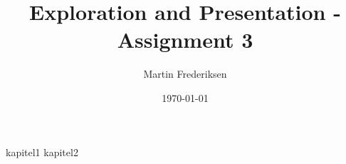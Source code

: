 \documentclass[10pt]{report}
\title{Exploration and Presentation - Assignment 3}
\author{Martin Frederiksen}
\date{\today}
\begin{document}
\hypersetup{pageanchor=false}
\begin{titlepage}
\maketitle
\end{titlepage}

\hypersetup{pageanchor=true}
\tableofcontents
{kapitel1}
{kapitel2}
\end{document}
